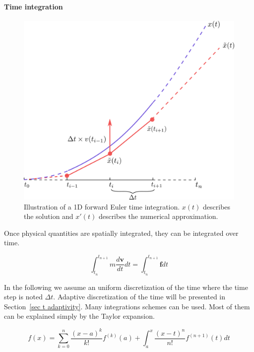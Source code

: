 \paragraph{Time integration}

\begin{figure}[!ht]
\centering
\includegraphics[scale=0.6]{images/continuum_mechanics/timeIntegration.png}
\caption[STAR mechanics: Temporal integration]{\label{fig:timeIntegration} 
	Illustration of a 1D forward Euler time integration. 
	$x(t)$ describes the solution and $x'(t)$ describes the numerical approximation.}
\end{figure}

Once physical quantities are spatially integrated, they can be integrated over time. 

\begin{equation}
\label{eq:timeIntegration1}
\displaystyle
\int_{t_{n}}^{t_{n+1}}
m \frac{d\mathbf{v}}{dt} dt
=
\int_{t_{n}}^{t_{n+1}}\mathbf{f} dt
\end{equation}

In the following we assume an uniform discretization of the time where the time step is noted $\Delta t$.
Adaptive discretization of the time will be presented in Section~\ref{sec t adaptivity}.
Many integrations schemes can be used. 
Most of them can be explained simply by the Taylor expansion.

\begin{equation}
\label{eq:taylorExpansion}
\displaystyle
f(x) = \sum_{k=0}^{n}\frac{\left(x-a\right)^{k}}{k!}f^{(k)}(a) + \int_{a}^{x}\frac{\left(x-t\right)^{n}}{n!}f^{(n+1)}(t)dt
\end{equation}

